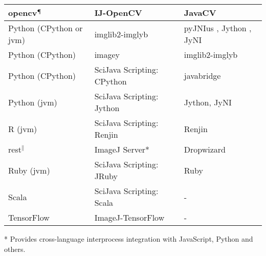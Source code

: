 \documentclass{bmcart}
\begin{document}
\begin{backmatter}
\begin{table}[h!]
\begin{tabular}{| l | l | l |}
      \acrshort{opencv}$^\mathparagraph$          \cite{opencv}          & IJ-OpenCV                             \cite{ij_opencv}               & JavaCV                                              \cite{javacv}          \\ \hline
      Python (CPython or \acrshort{jvm})          \cite{python}          & imglib2-imglyb                        \cite{imglib2_imglyb}          & pyJNIus \cite{pyjnius}, Jython \cite{jython}, JyNI  \cite{jyni}            \\ \hline
      Python (CPython)                                                   & imagey                                \cite{imagey}                  & imglib2-imglyb                                                             \\ \hline
      Python (CPython)                                                   & SciJava Scripting: CPython            \cite{scripting_cpython}       & javabridge                                          \cite{javabridge}      \\ \hline
      Python (\acrshort{jvm})                                            & SciJava Scripting: Jython             \cite{scripting_jython}        & Jython, JyNI                                                               \\ \hline
      R (\acrshort{jvm})                          \cite{r}               & SciJava Scripting: Renjin             \cite{scripting_renjin}        & Renjin                                              \cite{renjin}          \\ \hline
      \acrshort{rest}$^\|$                        \cite{rest}            & ImageJ Server*                        \cite{imagej_server}           & Dropwizard                                          \cite{dropwizard}      \\ \hline
      Ruby (\acrshort{jvm})                       \cite{ruby}            & SciJava Scripting: JRuby              \cite{scripting_jruby}         & Ruby                                                \cite{ruby}            \\ \hline
      Scala                                       \cite{scala}           & SciJava Scripting: Scala              \cite{scripting_scala}         & -                                                                          \\ \hline
      TensorFlow                                  \cite{tensorflow}      & ImageJ-TensorFlow                     \cite{imagej_tensorflow}       & -                                                                          \\ \hline
    \end{tabular}
    \begin{flushleft}
      * Provides cross-language interprocess integration with JavaScript, Python and others.


\end{flushleft}
\end{table}
\end{backmatter}
\end{document}
